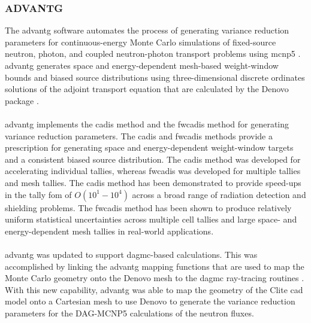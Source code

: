 \documentclass[12pt]{article}
\begin{document}
\subsubsection{ADVANTG}
The \gls{advantg} software automates the 
process of generating variance reduction parameters for continuous-energy Monte 
Carlo simulations of fixed-source neutron, photon, and coupled neutron-photon 
transport problems using \gls{mcnp5} \cite{advantg}. \gls{advantg} generates 
space and  energy-dependent mesh-based weight-window bounds and biased source 
distributions using three-dimensional discrete ordinates solutions of the 
adjoint transport equation that are calculated by the Denovo package 
\cite{denovo}. 
\\
\\
\gls{advantg} implements the \gls{cadis} method \cite{wagnerNSECADIS} and the 
\gls{fwcadis} method \cite{wagnerNSEFWCADIS} for generating variance reduction 
parameters. The \gls{cadis} and \gls{fwcadis} methods provide a prescription for
generating space and energy-dependent weight-window targets and a consistent 
biased source distribution. The \gls{cadis} method was developed for accelerating
individual tallies, whereas \gls{fwcadis} was developed for multiple tallies and
mesh tallies. The \gls{cadis} method has been demonstrated to provide speed-ups 
in the tally \gls{fom} of $O(10^1-10^4)$ across a broad range of radiation 
detection and shielding problems. The \gls{fwcadis} method has been shown to produce
 relatively uniform statistical uncertainties across multiple cell tallies and 
large space- and energy-dependent mesh tallies in real-world applications.
\\
\\
\gls{advantg} was updated to support \gls{dagmc}-based calculations. This was 
accomplished by linking the \gls{advantg} mapping functions that are used to 
map the Monte Carlo geometry onto the Denovo mesh to the \gls{dagmc}
ray-tracing routines \cite{biondoMC2015}. With this new capability, 
\gls{advantg} was able to map the geometry of the Clite \gls{cad} model onto a 
Cartesian mesh to use Denovo to generate the variance reduction parameters 
for the DAG-MCNP5 calculations of the neutron fluxes.
\end{document}
